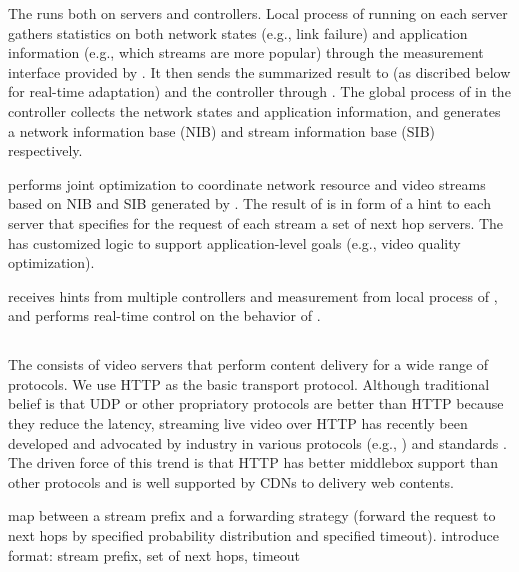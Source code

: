 \myparatight{\Discovery} The \discovery runs both on servers and controllers. Local process of \discovery running on each server gathers statistics on both network states (e.g., link failure) and application information (e.g., which streams are more popular) through the measurement interface provided by \data. It then sends the summarized result to \localControl (as discribed below for real-time adaptation) and the controller through \dissemination. The global process of \discovery in the controller collects the network states and application information, and generates a network information base (NIB) and stream information base (SIB) respectively.

\myparatight{\GlobalControl} \GlobalControl performs joint optimization to coordinate network resource and video streams based on NIB and SIB generated by \discovery. The result of \globalControl is in form of a hint to each server that specifies for the request of each stream a set of next hop servers. The \globalControl has customized logic to support application-level goals (e.g., video quality optimization).

\myparatight{\LocalControl} \LocalControl receives hints from multiple controllers and measurement from local process of \discovery, and performs real-time control on the behavior of \data. 



\subsection{\Data}

The \data consists of video servers that perform content delivery for a wide range of protocols. We use HTTP as the basic transport protocol. Although traditional belief is that UDP or other propriatory protocols are better than HTTP because they reduce the latency, streaming live video over HTTP has recently been developed and advocated by industry in various protocols (e.g., \cite{HLS, HDS}) and standards \cite{dash}. The driven force of this trend is that HTTP has better middlebox support than other protocols and is well supported by CDNs to delivery web contents.


 map between a stream prefix and a forwarding strategy (forward the request to next hops by specified probability distribution and specified timeout). introduce format: stream prefix, set of next hops, timeout

